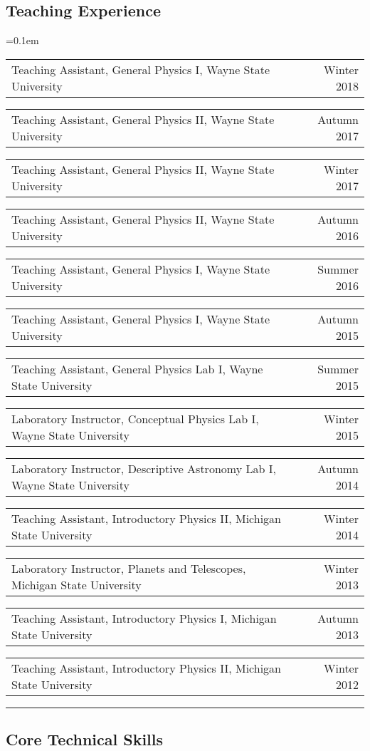 \documentclass[10pt,letterpaper]{article}
\makeatletter
\newcommand{\headerrow}[2]
{\begin{tabular*}{\linewidth}{l@{\extracolsep{\fill}}r}
	#1 &
	#2 \\
\end{tabular*}}
\makeatother
\begin{document}
\subsection*{Teaching Experience}

\begin{itemize*}
	\parskip=0.1em
	\item[]
	\headerrow
		{Teaching Assistant, General Physics I, Wayne State University}
		{Winter 2018}
	\item[]
	\headerrow
		{Teaching Assistant, General Physics II, Wayne State University}
		{Autumn 2017}
	\item[]
	\headerrow
		{Teaching Assistant, General Physics II, Wayne State University}
		{Winter 2017}
	\item[]
	\headerrow
		{Teaching Assistant, General Physics II, Wayne State University}
		{Autumn 2016}
	\item[]
	\headerrow
		{Teaching Assistant, General Physics I, Wayne State University}
		{Summer 2016}
	\item[]
	\headerrow
		{Teaching Assistant, General Physics I, Wayne State University}
		{Autumn 2015}	
	\item[]
	\headerrow
		{Teaching Assistant, General Physics Lab I, Wayne State University}
		{Summer 2015}
	\item[]
	\headerrow
		{Laboratory Instructor, Conceptual Physics Lab I, Wayne State University}
		{Winter 2015}
	\item[]
	\headerrow
		{Laboratory Instructor, Descriptive Astronomy Lab I, Wayne State University}
		{Autumn 2014}
	\item[]
	\headerrow
		{Teaching Assistant, Introductory Physics II, Michigan State University}
		{Winter 2014}
	\item[]
	\headerrow
		{Laboratory Instructor, Planets and Telescopes, Michigan State University}
		{Winter 2013}
	\item[]
	\headerrow
		{Teaching Assistant, Introductory Physics I, Michigan State University}
		{Autumn 2013}
	\item[]
	\headerrow
		{Teaching Assistant, Introductory Physics II, Michigan State University}
		{Winter 2012}
\end{itemize*}

\hrule
\vspace{-0.4em}
\subsection*{Core Technical Skills}
\end{document}
